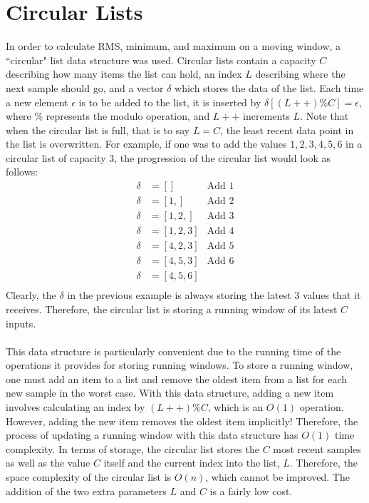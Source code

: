 \documentclass[12pt]{report}
\begin{document}
\begin{appendix}\label{appendices}
	\chapter{Circular Lists}\label{circularlists}
	In order to calculate RMS, minimum, and maximum on a moving window, a ``circular" list data
	structure was used. Circular lists contain a capacity $C$ describing how many items the list can
	hold, an index $L$ describing where the next sample should go, and a vector $\delta$ which
	stores the data of the list. Each time a new
	element $\epsilon$ is to be added to the list, it is inserted by $\delta[(L++)\%C] = \epsilon$,
	where $\%$ represents the modulo operation, and $L++$ increments $L$. Note that when the
	circular list is full, that is to say $L = C$, the least recent data point in the list is
	overwritten. For example, if one was to add the values $1,2,3,4,5,6$ in a circular list of
	capacity 3, the progression of the circular list would look as follows:
	\begin{equation*}
		\begin{aligned}
			\delta &= [] & \mbox{Add 1}\\
			\delta &= [1,] & \mbox{Add 2}\\
			\delta &= [1,2,] & \mbox{Add 3}\\
			\delta &= [1,2,3] & \mbox{Add 4}\\
			\delta &= [4,2,3] & \mbox{Add 5}\\
			\delta &= [4,5,3] & \mbox{Add 6}\\
			\delta &= [4,5,6]\\
		\end{aligned}
	\end{equation*}
	Clearly, the $\delta$ in the previous example is always storing the latest 3 values that it
	receives. Therefore, the circular list is storing a running window of its latest $C$ inputs.\\\\
	This data structure is particularly convenient due to the running time of the operations it
	provides for storing running windows. To store a running window, one must add an item to a list
	and remove the oldest item from a list for each new sample in the worst case. With this data
	structure, adding a new item involves calculating an index by $(L++)\%C$, which is an $O(1)$
	operation. However, adding the new item removes the oldest item implicitly! Therefore, the
	process of updating a running window with this data structure has $O(1)$ time complexity. In
	terms of storage, the circular list stores the $C$ most recent samples as well as the value $C$
	itself and the current index into the list, $L$. Therefore, the space complexity of the circular
	list is $O(n)$, which cannot be improved. The addition of the two extra parameters $L$ and $C$
	is a fairly low cost.\\


\end{appendix}
\end{document}
